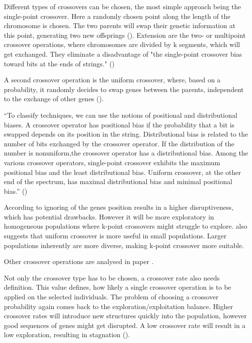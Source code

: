 Different types of crossovers can be chosen, the most simple approach being the single-point crossover. Here a randomly chosen point along the length of the chromosome is chosen. The two parents will swap their genetic information at this point, generating two new offsprings (\cite{katoch_review_2021}). Extension are the two- or multipoint crossover operations, where chromosomes are divided by k segments, which will get exchanged. They eliminate a disadvantage of "the single-point crossover bias toward bits at the ends of strings." (\cite{srinivas_genetic_1994})

A second crossover operation is the uniform crossover, where, based on a probability, it randomly decides to swap genes between the parents, independent to the exchange of other genes (\cite{katoch_review_2021}). 

\enquote{To classify techniques, we can use the notions of positional and distributional biases. A crossover operator has positional bias if the probability that a bit is swapped depends on its position in the string. Distributional bias is related to the number of bits exchanged by the crossover operator. If the distribution of the number is nonuniform,the crossover operator has a distributional bias. Among the various crossover operators, single-point crossover exhibits the maximum positional bias and the least distributional bias. Uniform crossover, at the other end of the spectrum, has maximal distributional bias and minimal positional bias.} (\cite{srinivas_genetic_1994})

According to \cite{srinivas_genetic_1994} ignoring of the genes position results in a higher disruptiveness, which has potential drawbacks. However it will be more exploratory in homogeneous populations where k-point crossovers might struggle to explore. \cite{srinivas_genetic_1994} also suggests that uniform crossover is more useful in small populations. Larger populations inherently are more diverse, making k-point crossover more suitable.

Other crossover operations are analysed in paper . 

Not only the crossover type has to be chosen, a crossover rate also needs definition. This value defines, how likely a single crossover operation is to be applied on the selected individuals.
The problem of choosing a crossover probability again comes back to the exploration/exploitation balance. Higher crossover rates will introduce new structures quickly into the population, however good sequences of genes might get disrupted. A low crossover rate will result in a low exploration, resulting in stagnation (\cite{grefenstette_optimization_1986}).

